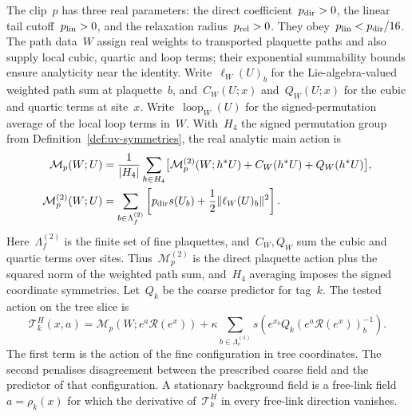 The clip~$p$ has three real parameters: the direct coefficient~$p_{\rm dir}>0$, the linear tail cutoff~$p_{\rm lin}>0$, and the relaxation radius~$p_{\rm rel}>0$. They obey~$p_{\rm lin}<p_{\rm dir}/16$. The path data~$W$ assign real weights to transported plaquette paths and also supply local cubic, quartic and loop terms; their exponential summability bounds ensure analyticity near the identity. Write~$\ell_W(U)_b$ for the Lie-algebra-valued weighted path sum at plaquette~$b$, and~$C_W(U;x)$ and~$Q_W(U;x)$ for the cubic and quartic terms at site~$x$. Write~$\operatorname{loop}_W(U)$ for the signed-permutation average of the local loop terms in~$W$. With~$H_4$ the signed permutation group from Definition~\ref{def:uv-symmetries}, the real analytic main action is
\begin{equation}\label{eq:uv-main-action}
 \begin{aligned}
 \mathcal M_p(W;U)&=\frac{1}{|H_4|}\sum_{h\in H_4}
      \bigl[\mathcal M_p^{(2)}(W;h^*U)+C_W(h^*U)+Q_W(h^*U)\bigr],\\
\mathcal M_p^{(2)}(W;U)&=\sum_{b\in\Lambda_f^{(2)}}
      \left[p_{\rm dir}s(U_b)+\frac12\|\ell_W(U)_b\|^2\right].
 \end{aligned}
\end{equation}
Here~$\Lambda_f^{(2)}$ is the finite set of fine plaquettes, and~$C_W,Q_W$ sum the cubic and quartic terms over sites. Thus~$\mathcal M_p^{(2)}$ is the direct plaquette action plus the squared norm of the weighted path sum, and~$H_4$ averaging imposes the signed coordinate symmetries. Let~$Q_k$ be the coarse predictor for tag~$k$. The tested action on the tree slice is
\begin{equation}\label{eq:uv-tested-action}
 \mathcal T^H_k(x,a)=
 \mathcal M_p\!\left(W;e^a\mathcal R(e^x)\right)
 +\kappa\sum_{b\in\Lambda_c^{(1)}}
 s\!\left(e^{x_b}Q_k\!\left(e^a\mathcal R(e^x)\right)_b^{-1}\right).
\end{equation}
The first term is the action of the fine configuration in tree coordinates. The second penalises disagreement between the prescribed coarse field and the predictor of that configuration. A stationary background field is a free-link field~$a=\rho_k(x)$ for which the derivative of~$\mathcal T^H_k$ in every free-link direction vanishes.

